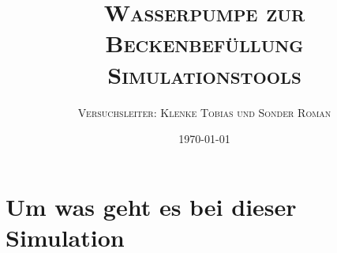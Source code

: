 \documentclass[10pt,a4paper,oneside]{article}
\title{
	\textsc{\huge{Wasserpumpe zur Beckenbefüllung}}\\[4ex]
	\textsc{Simulationstools}
}
\author{\textsc{Versuchsleiter: Klenke Tobias und Sonder Roman}}
\date{\today}
\begin{document}
\maketitle
\noindent %
\clearpage
\color{black}

\setcounter{page}{1}
%

%

\tableofcontents
\clearpage


\setcounter{page}{1}
\section{Um was geht es bei dieser Simulation}\label{sec:arbeitsgrundlagen}

\clearpage
\end{document}
